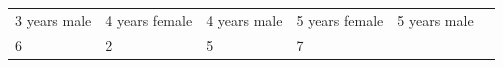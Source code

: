 \begin{enumerate}[noitemsep, label=\textbf{\arabic*}. ]
{\begin{center}
\begin{xtabular*}{\mytablewidth}[t]{|p{10\mystarwidth}|p{10\mystarwidth}|p{10\mystarwidth}|p{10\mystarwidth}|p{10\mystarwidth}|p{10\mystarwidth}|}
    
        3 years male &
    
    
        4 years female &
    
    
        4
years male &
    
    
        5 years female &
    
    
        5 years male%
     \tabularnewline{}
    
    
        6 &
    
    
        2 &
    
    
        5 &
    
    
        7 &
    

\end{xtabular*}
\end{center}}
\end{enumerate}
